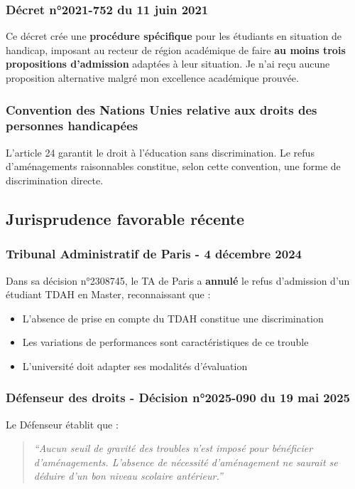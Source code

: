 \documentclass[12pt,french,a4paper]{article}
\begin{document}
\subsubsection{Décret n°2021-752 du 11 juin 2021}

Ce décret crée une \textbf{procédure spécifique} pour les étudiants en situation de handicap, imposant au recteur de région académique de faire \textbf{au moins trois propositions d'admission} adaptées à leur situation. Je n'ai reçu aucune proposition alternative malgré mon excellence académique prouvée.

\subsubsection{Convention des Nations Unies relative aux droits des personnes handicapées}

L'article 24 garantit le droit à l'éducation sans discrimination. Le refus d'aménagements raisonnables constitue, selon cette convention, une forme de discrimination directe.

\subsection{Jurisprudence favorable récente}

\subsubsection{Tribunal Administratif de Paris - 4 décembre 2024}

Dans sa décision n°2308745, le TA de Paris a \textbf{annulé} le refus d'admission d'un étudiant TDAH en Master, reconnaissant que :
\begin{itemize}
\item L'absence de prise en compte du TDAH constitue une discrimination
\item Les variations de performances sont caractéristiques de ce trouble
\item L'université doit adapter ses modalités d'évaluation
\end{itemize}

\subsubsection{Défenseur des droits - Décision n°2025-090 du 19 mai 2025}

Le Défenseur établit que :
\begin{quote}
\textit{``Aucun seuil de gravité des troubles n'est imposé pour bénéficier d'aménagements. L'absence de nécessité d'aménagement ne saurait se déduire d'un bon niveau scolaire antérieur.''}
\end{quote}
\end{document}
